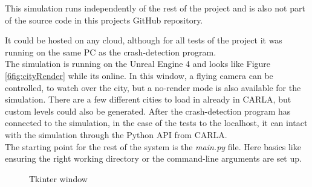 \noindent
This simulation runs independently of the rest of the project
and is also not part of the source code in this projects GitHub repository.

\noindent
It could be hosted on any cloud,
although for all tests of the project
it was running on the same PC as the crash-detection program.
\\
\newline
The simulation is running on the Unreal Engine 4 
and looks like Figure \ref{6fig:cityRender} while its online.
In this window, a flying camera can be controlled,
to watch over the city,
but a no-render mode is also available for the simulation.
There are a few different cities to load in already in CARLA,
but custom levels could also be generated.
After the crash-detection program has connected to the simulation,
in the case of the tests to the localhost,
it can intact with the simulation through the Python API from CARLA. 
\\
\newline
The starting point for the rest of the system is the \emph{main.py} file.
Here basics like ensuring the right
working directory or the command-line arguments are set up.

\begin{figure}
    \vspace{-16pt}
    \vspace{-10pt}
  \caption{Tkinter window}
  \label{6fig:ui}
    \vspace{-10pt}
\end{figure}


